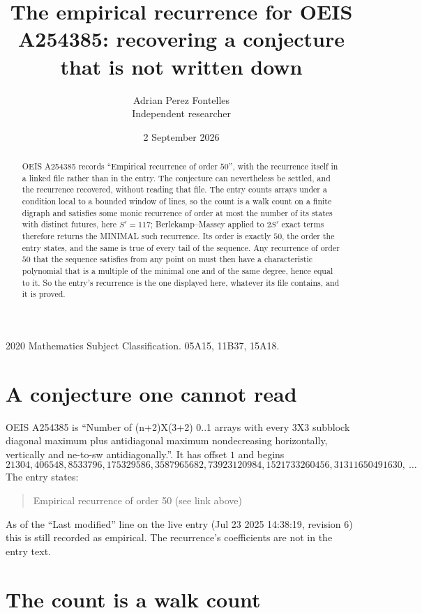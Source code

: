 \documentclass[11pt,a4paper]{article}
\title{The empirical recurrence for OEIS A254385: recovering a conjecture that is not written down}
\author{Adrian Perez Fontelles\\ \small Independent researcher}
\date{2 September 2026}
\theoremstyle{plain}
\theoremstyle{definition}
\begin{document}
\maketitle

\begin{abstract}
OEIS A254385 records ``Empirical recurrence of order $50$'', with the recurrence itself in a
linked file rather than in the entry. The conjecture can nevertheless be settled, and the
recurrence recovered, without reading that file. The entry counts arrays under a condition
local to a bounded window of lines, so the count is a walk count on a finite digraph and
satisfies some monic recurrence of order at most the number of its states with distinct
futures, here $S'=117$; Berlekamp--Massey applied to $2S'$ exact
terms therefore returns the MINIMAL such recurrence. Its order is exactly $50$, the order
the entry states, and the same is true of every tail of the sequence. Any recurrence of order
$50$ that the sequence satisfies from any point on must then have a characteristic
polynomial that is a multiple of the minimal one and of the same degree, hence equal to it. So
the entry's recurrence is the one displayed here, whatever its file contains, and it is
proved.
\end{abstract}

\noindent\small 2020 Mathematics Subject Classification. 05A15, 11B37, 15A18.\normalsize

\section{A conjecture one cannot read}

OEIS A254385 is ``Number of (n+2)X(3+2) 0..1 arrays with every 3X3 subblock diagonal maximum plus antidiagonal maximum nondecreasing horizontally, vertically and ne-to-sw antidiagonally.''. It has offset $1$ and begins
\[
21304, 406548, 8533796, 175329586, 3587965682, 73923120984, 1521733260456, 31311650491630,\ \dots
\]
The entry states:
\begin{quote}
Empirical recurrence of order 50 (see link above)
\end{quote}
As of the ``Last modified'' line on the live entry (Jul 23 2025 14:38:19, revision 6) this is still
recorded as empirical. The recurrence's coefficients are not in the entry text.

\section{The count is a walk count}
\end{document}
